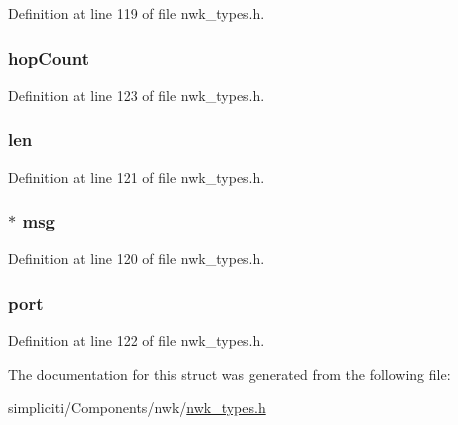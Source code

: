 \-Definition at line 119 of file nwk\-\_\-types.\-h.

\hypertarget{structioctlRawReceive__t_a95f97d42c2a291fbda2d2b4e82e12391}{
\subsubsection[{hop\-Count}]{ {\bf hop\-Count}}}\label{structioctlRawReceive__t_a95f97d42c2a291fbda2d2b4e82e12391}


\-Definition at line 123 of file nwk\-\_\-types.\-h.

\hypertarget{structioctlRawReceive__t_a5723e60ffd628510c699eddbce90be23}{
\subsubsection[{len}]{ {\bf len}}}\label{structioctlRawReceive__t_a5723e60ffd628510c699eddbce90be23}


\-Definition at line 121 of file nwk\-\_\-types.\-h.

\hypertarget{structioctlRawReceive__t_a8dd37bf01473e324d7c15a19fd211de9}{
\subsubsection[{msg}]{$\ast$ {\bf msg}}}\label{structioctlRawReceive__t_a8dd37bf01473e324d7c15a19fd211de9}


\-Definition at line 120 of file nwk\-\_\-types.\-h.

\hypertarget{structioctlRawReceive__t_a2fa54f9024782843172506fadbee2ac8}{
\subsubsection[{port}]{ {\bf port}}}\label{structioctlRawReceive__t_a2fa54f9024782843172506fadbee2ac8}


\-Definition at line 122 of file nwk\-\_\-types.\-h.



\-The documentation for this struct was generated from the following file\-:\begin{DoxyCompactItemize}
\item 
simpliciti/\-Components/nwk/\hyperlink{nwk__types_8h}{nwk\-\_\-types.\-h}\end{DoxyCompactItemize}

